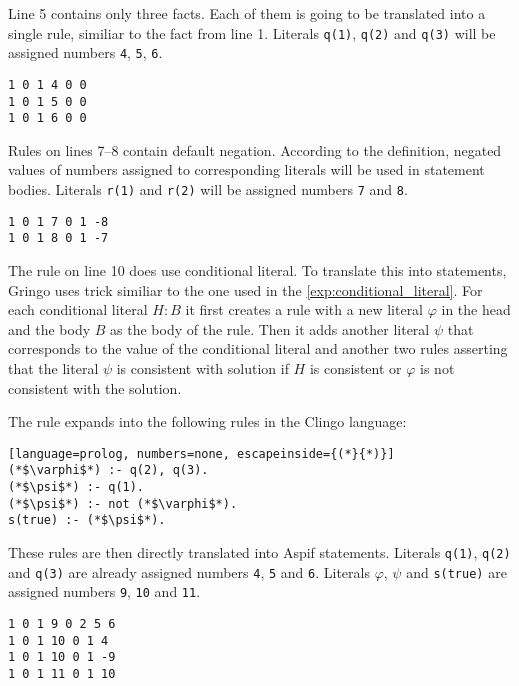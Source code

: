 \begin{example}
    Line 5 contains only three facts. Each of them is going to be translated into a single
    rule, similiar to the fact from line 1. Literals \texttt{q(1)}, \texttt{q(2)} and \texttt{q(3)}
    will be assigned numbers \texttt{4}, \texttt{5}, \texttt{6}.
    \begin{lstlisting}[firstnumber=5]
1 0 1 4 0 0
1 0 1 5 0 0
1 0 1 6 0 0
\end{lstlisting}

    Rules on lines 7--8 contain default negation. According to the definition, negated values
    of numbers assigned to corresponding literals will be used in statement bodies.
    Literals \texttt{r(1)} and \texttt{r(2)} will be assigned numbers \texttt{7} and \texttt{8}.
    \begin{lstlisting}[firstnumber=8]
1 0 1 7 0 1 -8
1 0 1 8 0 1 -7
\end{lstlisting}

    The rule on line 10 does use conditional literal.
    To translate this into statements, Gringo uses trick similiar to the one used
    in the \cref{exp:conditional_literal}.
    For each conditional literal $H : B$ it first creates a rule with a new literal
    $\varphi$ in the head and the body $B$ as the body of the rule.
    Then it adds another literal $\psi$ that corresponds to the value of
    the conditional literal and another two rules asserting that the literal
    $\psi$ is consistent with solution if $H$ is consistent or
    $\varphi$ is not consistent with the solution.

    The rule expands into the following rules in the Clingo language:
    \begin{lstlisting}[language=prolog, numbers=none, escapeinside={(*}{*)}]
(*$\varphi$*) :- q(2), q(3).
(*$\psi$*) :- q(1).
(*$\psi$*) :- not (*$\varphi$*).
s(true) :- (*$\psi$*).
\end{lstlisting}
    These rules are then directly translated into Aspif statements.
    Literals \texttt{q(1)}, \texttt{q(2)} and \texttt{q(3)} are already
    assigned numbers \texttt{4}, \texttt{5} and \texttt{6}. Literals
    $\varphi$, $\psi$ and \texttt{s(true)} are assigned numbers 
    \texttt{9}, \texttt{10} and \texttt{11}.
    \begin{lstlisting}[firstnumber=10]
1 0 1 9 0 2 5 6
1 0 1 10 0 1 4
1 0 1 10 0 1 -9
1 0 1 11 0 1 10
\end{lstlisting}


\end{example}
